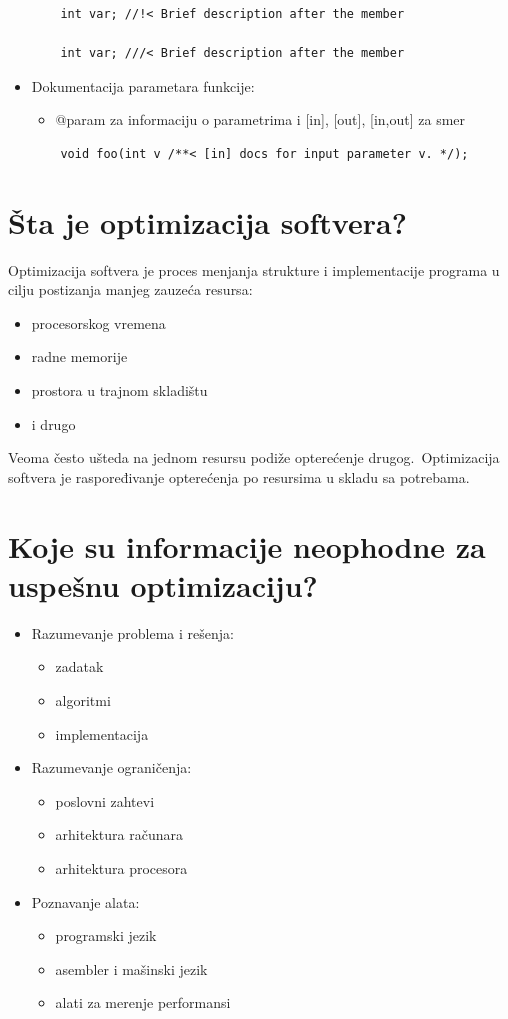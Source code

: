 \documentclass[a4paper]{article}
\begin{document}
\begin{itemize}
\begin{lstlisting}
    int var; //!< Brief description after the member 
  
    int var; ///< Brief description after the member\end{lstlisting}
    \item Dokumentacija parametara funkcije:
    \begin{itemize}
      \item @param za informaciju o parametrima i [in], [out], [in,out] za smer
    \end{itemize}
    \begin{lstlisting}
    void foo(int v /**< [in] docs for input parameter v. */);\end{lstlisting}
    
  \end{itemize}
\section{Šta je optimizacija softvera?}
  Optimizacija softvera je proces menjanja strukture i implementacije programa u cilju postizanja 
  manjeg zauzeća resursa:
  \begin{itemize}
    \item procesorskog vremena
    \item radne memorije
    \item prostora u trajnom skladištu
    \item i drugo
  \end{itemize}
  Veoma često ušteda na jednom resursu podiže opterećenje drugog.\
  Optimizacija softvera je raspoređivanje opterećenja po resursima u skladu sa potrebama.

\section{Koje su informacije neophodne za uspešnu optimizaciju?}
  \begin{itemize} 
    \item Razumevanje problema i rešenja:
      \begin{itemize}
        \item zadatak
        \item algoritmi
        \item implementacija 
      \end{itemize}
    \item Razumevanje ograničenja:
      \begin{itemize}
        \item poslovni zahtevi
        \item arhitektura računara
        \item arhitektura procesora 
      \end{itemize}
    \item Poznavanje alata:
      \begin{itemize}
        \item programski jezik
        \item asembler i mašinski jezik
        \item alati za merenje performansi
      \end{itemize}
  \end{itemize}
  
\end{document}
